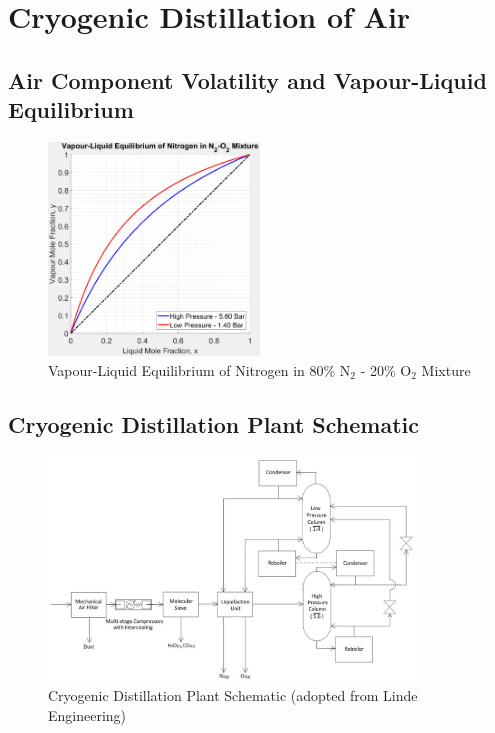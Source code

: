 

%
\section{Cryogenic Distillation of Air}

    \subsection{Air Component Volatility and Vapour-Liquid Equilibrium}
    \begin{figure}[ht]
        \centering
        \includegraphics[width=0.5\textwidth]{airseparation/handouts/graphics/VLEdata_va.jpg}
        \caption{Vapour-Liquid Equilibrium of Nitrogen in 80\% N$_2$ - 20\% O$_2$ Mixture}
        \label{fig:VLE}
    \end{figure}

    \subsection{Cryogenic Distillation Plant Schematic}
    \begin{figure}[ht]
        \centering
        \includegraphics[width=0.87\textwidth]{airseparation/handouts/graphics/plant_diagram.jpg}
        \caption{Cryogenic Distillation Plant Schematic (adopted from Linde Engineering)}
        \label{fig:plant_schematic}
    \end{figure}
    
